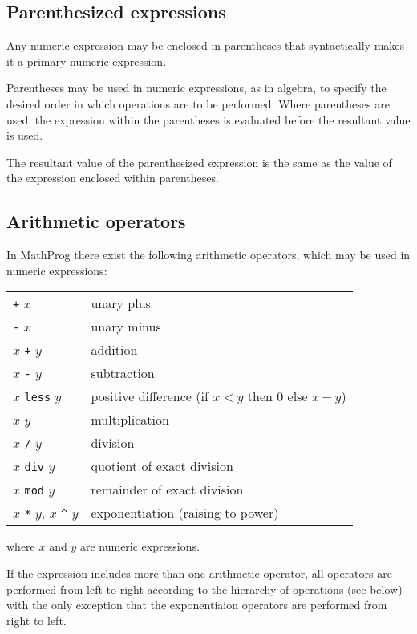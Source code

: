 \documentclass[11pt]{report}
\begin{document}
\newpage

\subsection{Parenthesized expressions}

Any numeric expression may be enclosed in parentheses that
syntactically makes it a primary numeric expression.

Parentheses may be used in numeric expressions, as in algebra, to
specify the desired order in which operations are to be performed.
Where parentheses are used, the expression within the parentheses is
evaluated before the resultant value is used.

The resultant value of the parenthesized expression is the same as the
value of the expression enclosed within parentheses.

\subsection{Arithmetic operators}

In MathProg there exist the following arithmetic operators, which may
be used in numeric expressions:

\begin{tabular}{@{}ll@{}}
{\tt +} $x$&unary plus\\
{\tt -} $x$&unary minus\\
$x$ {\tt +} $y$&addition\\
$x$ {\tt -} $y$&subtraction\\
$x$ {\tt less} $y$&positive difference (if $x<y$ then 0 else $x-y$)\\
$x$ {\tt *} $y$&multiplication\\
$x$ {\tt /} $y$&division\\
$x$ {\tt div} $y$&quotient of exact division\\
$x$ {\tt mod} $y$&remainder of exact division\\
$x$ {\tt **} $y$, $x$ {\tt\textasciicircum} $y$&exponentiation (raising
to power)\\
\end{tabular}

\noindent where $x$ and $y$ are numeric expressions.

If the expression includes more than one arithmetic operator, all
operators are performed from left to right according to the hierarchy
of operations (see below) with the only exception that the
exponentiaion operators are performed from right to left.
\end{document}
